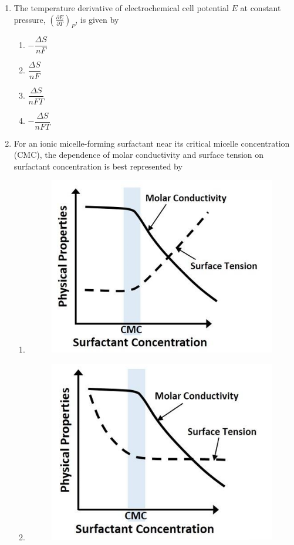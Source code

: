 \documentclass{article}
\begin{document}
\begin{enumerate}
\item The temperature derivative of electrochemical cell potential $E$ at constant pressure,
$\left(\frac{\partial E}{\partial T}\right)_P$,
 is given by
\begin{multicols}{2}
\begin{enumerate}
    \item $-\dfrac{\Delta S}{nF}$
    \item $\dfrac{\Delta S}{nF}$
    \item $\dfrac{\Delta S}{nFT}$
    \item $-\dfrac{\Delta S}{nFT}$
\end{enumerate}
\end{multicols}

\item For an ionic micelle-forming surfactant near its critical micelle concentration (CMC), the dependence of molar conductivity and surface tension on surfactant concentration is best represented by

\begin{multicols}{2}
    \begin{enumerate}
        \item \begin{figure}[H]
            \centering
            \includegraphics[width=0.4\columnwidth]{figures/cy_q10a.png}
            \label{fig:placeholder}
        \end{figure}

        \item \begin{figure}[H]
            \centering
            \includegraphics[width=0.4\columnwidth]{figures/cy_10b.png}
            \label{fig:placeholder}
        \end{figure}


\end{enumerate}
\end{multicols}
\end{enumerate}
\end{document}
